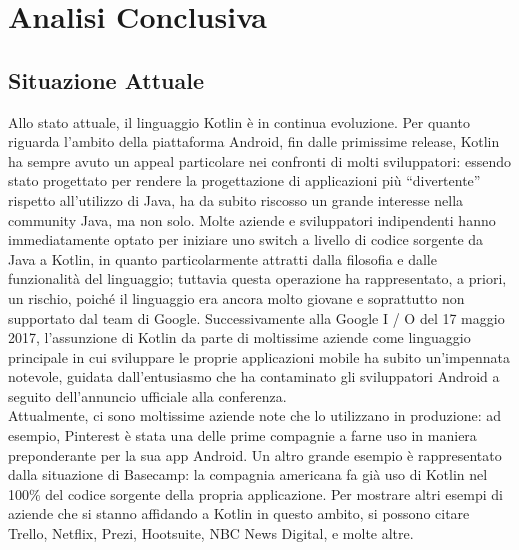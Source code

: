 
\chapter{Analisi Conclusiva}


\section{Situazione Attuale}
Allo stato attuale, il linguaggio Kotlin è in continua evoluzione. Per quanto riguarda l'ambito della piattaforma Android, fin dalle primissime release, Kotlin ha sempre avuto un appeal particolare nei confronti di molti sviluppatori: essendo stato progettato per rendere la progettazione di applicazioni più “divertente” rispetto all’utilizzo di Java, ha da subito riscosso un grande interesse nella community Java, ma non solo. Molte aziende e sviluppatori indipendenti hanno immediatamente optato per iniziare uno switch a livello di codice sorgente da Java a Kotlin, in quanto particolarmente attratti dalla filosofia e dalle funzionalità del linguaggio; tuttavia questa operazione ha rappresentato, a priori, un rischio, poiché il linguaggio era ancora molto giovane e soprattutto non supportato dal team di Google. Successivamente alla Google I / O del 17 maggio 2017, l’assunzione di Kotlin da parte di moltissime aziende come linguaggio principale in cui sviluppare le proprie applicazioni mobile ha subito un’impennata notevole, guidata dall’entusiasmo che ha contaminato gli sviluppatori Android a seguito dell’annuncio ufficiale alla conferenza.\\

Attualmente, ci sono moltissime aziende note che lo utilizzano in produzione: ad esempio, Pinterest è stata una delle prime compagnie a farne uso in maniera preponderante per la sua app Android. Un altro grande esempio è rappresentato dalla situazione di Basecamp: la compagnia americana fa già uso di Kotlin nel 100\% del codice sorgente della propria applicazione. Per mostrare altri esempi di aziende che si stanno affidando a Kotlin in questo ambito, si possono citare Trello, Netflix, Prezi, Hootsuite, NBC News Digital, e molte altre.\\

